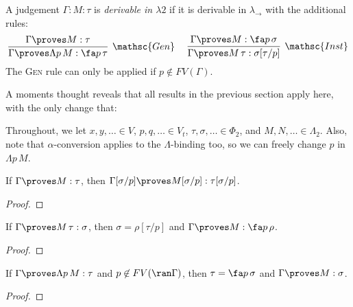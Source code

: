 \documentclass[reqno]{amsart}
\begin{document}
    \begin{definition}
        A judgement $\Gamma:M:\tau$ is \textit{derivable in $\lambda2$} if it is derivable in $\lambda_\rightarrow$ with the additional rules:
        \begin{equation*}
            \infer[\mathsc{Gen}]{\Gamma\proves\Lambda p\,M:\fa p\,\tau}{\Gamma\proves M:\tau}\ \ \ \ 
            \infer[\mathsc{Inst}]{\Gamma\proves M\,\tau:\sigma[\tau/p]}{\Gamma\proves M:\fa p\,\sigma}
        \end{equation*}
        The \textsc{Gen} rule can only be applied if $p\not\in FV(\Gamma)$.
    \end{definition}

    A moments thought reveals that all results in the previous section apply here, with the only change that:

    \begin{notation}
        Throughout, we let $x,y,\ldots\in V$, $p,q,\ldots\in V_t$, $\tau,\sigma,\ldots\in\Phi_2$, and $M,N,\ldots\in\Lambda_2$. Also, note that $\alpha$-conversion applies to the $\Lambda$-binding too, so we can freely change $p$ in $\Lambda p\,M$.
    \end{notation}

    \begin{lemma}\label{lem:polymorphic_variable_substitution}
        If $\Gamma\proves M:\tau$, then $\Gamma[\sigma/p]\proves M[\sigma/p]:\tau[\sigma/p]$.
    \end{lemma}
    \begin{proof}
        \TODO
    \end{proof}

    \begin{lemma}\label{lem:polymorphic_generation_1}
        If $\Gamma\proves M\,\tau:\sigma$, then $\sigma=\rho[\tau/p]$ and $\Gamma\proves M:\fa p\,\rho$.
    \end{lemma}
    \begin{proof}
        \TODO
    \end{proof}

    \begin{lemma}\label{lem:polymorphic_generation_2}
        If $\Gamma\proves\Lambda p\,M:\tau$ and $p\not\in FV(\ran\Gamma)$, then $\tau=\fa p\,\sigma$ and $\Gamma\proves M:\sigma$.
    \end{lemma}
    \begin{proof}
        \TODO
    \end{proof}
\end{document}
